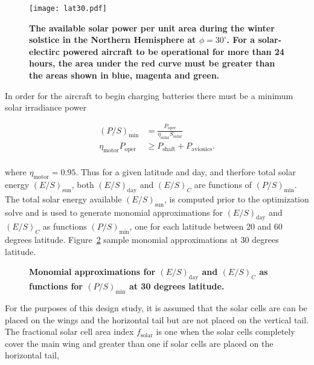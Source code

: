 \documentclass[]{aiaa-tc}%
\begin{document}
\begin{figure}[H]
	\begin{center}
	\texttt{[image: lat30.pdf]}
    \caption{\textbf{The available solar power per unit area during the winter solstice in the Northern Hemisphere at $\phi=30^{\circ}$. For a solar-electirc powered aircraft to be operational for more than 24 hours, the area under the red curve must be greater than the areas shown in blue, magenta and green.}}
	\label{f:lat30}
	\end{center}
\end{figure}

In order for the aircraft to begin charging batteries there must be a minimum solar irradiance power

\begin{align}
    (P/S)_{\text{min}} &= \frac{P_{\text{oper}}}{\eta_{\text{solar}} S_{\text{solar}}} \\
    \eta_{\text{motor}} P_{\text{oper}} &\geq P_{\text{shaft}} + P_{\text{avionics}}. \\
\end{align}

where $\eta_{\text{motor}} = 0.95$. Thus for a given latitude and day, and therfore total solar energy $(E/S)_{\text{sun}}$, both $(E/S)_{\text{day}}$ and $(E/S)_C$ are functions of $(P/S)_{\text{min}}$.  
The total solar energy available $(E/S)_{\text{sun}}$, is computed prior to the optimization solve and is used to generate monomial approximations for $(E/S)_{\text{day}}$ and $(E/S)_C$ as functions $(P/S)_{\text{min}}$, one for each latitude between 20 and 60 degrees latitude. 
Figure~\ref{f:energyapprox} sample monomial approximations at 30 degrees latitude. 

\begin{figure}[H]
 \begin{subfigmatrix}{2}%
 \end{subfigmatrix}
 \caption{\textbf{Monomial approximations for $(E/S)_{\text{day}}$ and $(E/S)_C$ as functions for $(P/S)_{\text{min}}$ at 30 degrees latitude.}}
 \label{f:energyapprox}
\end{figure}

    For the purposes of this design study, it is assumed that the solar cells are can be placed on the wings and the horizontal tail but are not placed on the vertical tail.  
    The fractional solar cell area index $f_{\text{solar}}$ is one when the solar cells completely cover the main wing and greater than one if solar cells are placed on the horizontal tail,
\end{document}
